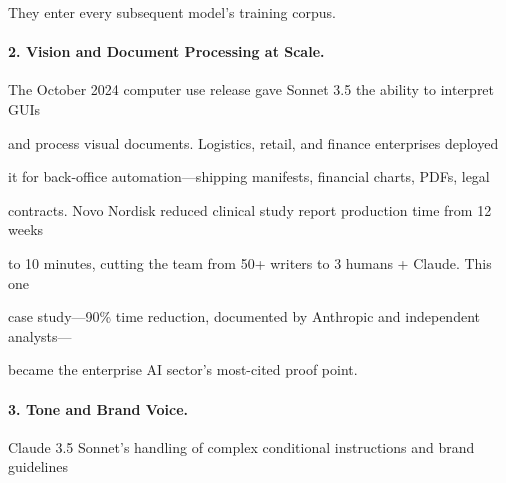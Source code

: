 \documentclass[11pt]{article}
\theoremstyle{definition}
\begin{document}
They enter every subsequent model's training corpus.











\paragraph{2. Vision and Document Processing at Scale.}





The October 2024 computer use release gave Sonnet 3.5 the ability to interpret GUIs





and process visual documents. Logistics, retail, and finance enterprises deployed





it for back-office automation---shipping manifests, financial charts, PDFs, legal





contracts. Novo Nordisk reduced clinical study report production time from 12 weeks





to 10 minutes, cutting the team from 50+ writers to 3 humans + Claude. This one





case study---90\% time reduction, documented by Anthropic and independent analysts---





became the enterprise AI sector's most-cited proof point.











\paragraph{3. Tone and Brand Voice.}





Claude 3.5 Sonnet's handling of complex conditional instructions and brand guidelines
\end{document}
